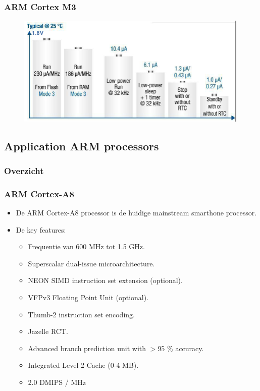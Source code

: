\documentclass{beamer}
\begin{document}
\begin{frame} 
\frametitle{ARM Cortex M3}
\begin{figure}[h] \begin{center}
\includegraphics[width=0.99\textwidth]{figures/arm-cortexM3power.png}
\end{center} \end{figure}
\end{frame}

% 


\subsection{Application ARM processors}
\begin{frame}
\frametitle{Overzicht}
\tableofcontents[sectionstyle=show/shaded,subsectionstyle=show/shaded] 
\end{frame}

\begin{frame} 
\frametitle{ARM Cortex-A8}
    \begin{itemize}
      \item <1-> De ARM Cortex-A8 processor is de huidige mainstream smarthone processor.
      \item <2-> De key features:
      \begin{itemize}
	  \item Frequentie van 600 MHz tot 1.5 GHz.
	  \item Superscalar dual-issue microarchitecture.
	  \item NEON SIMD instruction set extension (optional).
	  \item VFPv3 Floating Point Unit (optional).
	  \item Thumb-2 instruction set encoding.
	  \item Jazelle RCT.
	  \item Advanced branch prediction unit with $>$95 $\%$ accuracy.
	  \item Integrated Level 2 Cache (0-4 MB).
	  \item 2.0 DMIPS / MHz
      \end{itemize}
  \end{itemize}
\end{frame}
\end{document}
